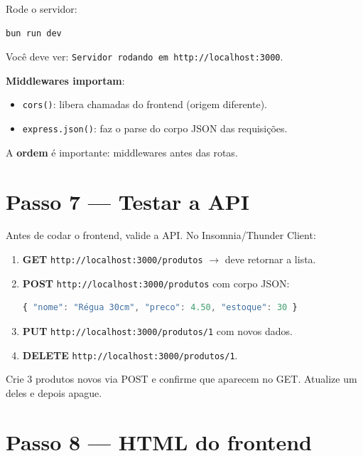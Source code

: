 \documentclass[11pt,a4paper]{article}
\begin{document}
Rode o servidor:

\begin{lstlisting}[language=bash]
bun run dev
\end{lstlisting}

Você deve ver: \texttt{\color{verdeOk}Servidor rodando em http://localhost:3000}.

\begin{caixa-dica}
\textbf{Middlewares importam}:
\begin{itemize}
  \item \texttt{cors()}: libera chamadas do frontend (origem diferente).
  \item \texttt{express.json()}: faz o parse do corpo JSON das requisições.
\end{itemize}
A \textbf{ordem} é importante: middlewares antes das rotas.
\end{caixa-dica}

\section{Passo 7 --- Testar a API}

Antes de codar o frontend, valide a API. No Insomnia/Thunder Client:

\begin{enumerate}[itemsep=2pt]
  \item \textbf{GET} \texttt{http://localhost:3000/produtos} $\rightarrow$ deve retornar a lista.
  \item \textbf{POST} \texttt{http://localhost:3000/produtos} com corpo JSON:
\begin{lstlisting}[language=JavaScript]
{ "nome": "Régua 30cm", "preco": 4.50, "estoque": 30 }
\end{lstlisting}
  \item \textbf{PUT} \texttt{http://localhost:3000/produtos/1} com novos dados.
  \item \textbf{DELETE} \texttt{http://localhost:3000/produtos/1}.
\end{enumerate}

\begin{caixa-pratica}
Crie 3 produtos novos via POST e confirme que aparecem no GET. Atualize um deles e depois apague.
\end{caixa-pratica}

\section{Passo 8 --- HTML do frontend}
\end{document}

